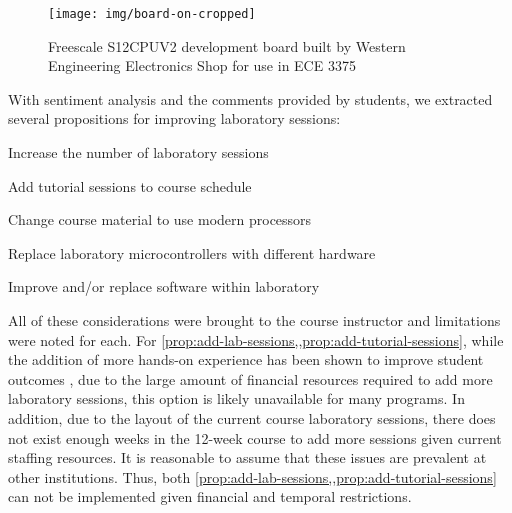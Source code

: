 \begin{figure}[bh!]
    \centering
    \texttt{[image: img/board-on-cropped]}
    \caption{Freescale S12CPUV2 development board built by Western Engineering Electronics Shop for use in ECE 3375}
    \label{fig:hc12-board}
\end{figure}

With sentiment analysis and the comments provided by students, we extracted several propositions for improving laboratory sessions: 

\begin{propositions}%
    \item Increase the number of laboratory sessions 
        \label{prop:add-lab-sessions}
    \item Add tutorial sessions to course schedule
        \label{prop:add-tutorial-sessions}
    \item Change course material to use modern processors
        \label{prop:change-course-materials}
    \item Replace laboratory microcontrollers with different hardware
        \label{prop:replace-hardware} %
    \item Improve and/or replace software within laboratory
        \label{prop:replace-software}
\end{propositions}

All of these considerations were brought to the course instructor and limitations were noted for each. For \cref{prop:add-lab-sessions,,prop:add-tutorial-sessions}, while the addition of more hands-on experience has been shown to improve student outcomes \cite{Ristov2011, Stolikj2011}, due to the large amount of financial resources required to add more laboratory sessions, this option is likely unavailable for many programs. In addition, due to the layout of the current course laboratory sessions, there does not exist enough weeks in the 12-week course to add more sessions given current staffing resources. It is reasonable to assume that these issues are prevalent at other institutions. Thus, both \cref{prop:add-lab-sessions,,prop:add-tutorial-sessions} can not be implemented given financial and temporal restrictions.

